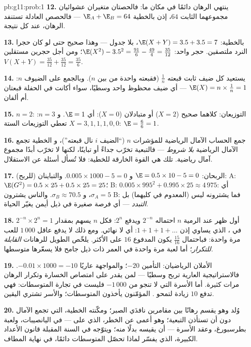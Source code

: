 \begin{solution}{pb:g11:prob:1}
\textbf{12.} ينتهي الرهان دائمًا في مكان ما: فالحصتان
متغيران عشوائيان مجموعهما الثابت $64$، إذن بالخطية
$\E_A + \E_B = 64$ --- فالحصص العادلة تستنفد الرهان،
عند كل نتيجة.

\textbf{13.} بالخطية: $\E(X + Y) = 3.5 + 3.5 = 7$، بلا جدول
--- وهذا صحيح حتى لو كان حجرا النرد ملتصقين.  حجر واحد:
$\E(X^2) - 3.5^2 = \frac{91}{6} - \frac{49}{4} = \frac{35}{12}$؛
ومن أجل حجرين مستقلين
$V(X + Y) = \frac{35}{12} + \frac{35}{12} = \frac{35}{6}$.

\textbf{14.} يستعيد كل ضيف ثابت قبعته 
$\frac1n$ (فقبعته واحدة من بين $n$). وبالجمع
على الضيوف $n$:
$\E(X) = n \times \frac1n = 1$ --- أي ضيف محظوظ واحد وسطيًا،
سواء أكانت في الحفلة قبعتان أم ألفان.

\textbf{15.} $n = 2$: التوزيعان: كلاهما صحيح ($X = 2$) أو
متبادلان ($X = 0$): أي $\E = 1$. و $n = 3$: تعطي التوزيعات الستة
$X = 3, 1, 1, 1, 0, 0$: $\E = \frac{6}{6} = 1$.

\textbf{16.} جمع الحساب الآمال الرياضية للمؤشرات $n$
 (``الضيف $i$ نال قبعته'')، و
الخطية تجمع الآمال الرياضية \emph{بلا شروط} ---
فالتبعية تخرّب جداءً أو تباينًا، لكنها لا تخرّب أبدًا
مجموع آمال رياضية. تلك هي القوة الخارقة للخطية: فلا
تُسأل أسئلة عن الاستقلال.

\textbf{17.} الربحان: $\E = 0.5 \times 10 - 5 = 0$ و
$0.005 \times 1000 - 5 = 0$. والتباينان (للربح):
A: $\E(G^2) = 0.5 \times 25 + 0.5 \times 25 = 25$؛
B: $0.005 \times 995^2 + 0.995 \times 25 \approx 4\,975$:
أي $\sigma_A = 5$، و $\sigma_B \approx 70.5$. والناس يشترون B: فما
يشترونه ليس  (المعدوم في كليهما) بل
\emph{التبدد} --- أي فرصة صغيرة في ذيل أيمن يغيّر الحياة.

\textbf{18.} أول ظهر عند الرمية $n$ احتماله
$2^{-n}$ ويدفع $2^n$: فكل $n$ يسهم بمقدار
$2^{-n} \times 2^n = 1$ في ، الذي يساوي إذن
$1 + 1 + 1 + \dots$: أي لا نهائي. ومع ذلك لا يدفع عاقل
$1\,000$ للعب مرة واحدة: فباحتمال $\frac{15}{16}$ يكون
المدفوع $16$ على الأكثر.  يلخّص  الطويل
للرهانات \emph{القابلة للتكرار}؛ أما لعبة مرة واحدة في العمر ذات
ذيل جامح فلا يسعّرها متوسطها.

\textbf{19.} الأملان الرياضيان: التأمين $-20$؛ والمواجهة عاريًا
$-0.01 \times 1000 = -10$. فالاستراتيجية العارية تربح وسطيًا
--- لمن يقدر على امتصاص الخسارة وتكرار الرهان
مرات كثيرة. أما الأسرة التي لا تنجو من $-1\,000$ فليست
في تجارة المتوسطات: فهي تدفع $10$ زيادة لتمحو
. المؤمّنون يأخذون المتوسطات؛ والأسر تشتري اليقين.

\textbf{20.} وُلد وهو يقسم رهانًا بين مقامرين
نافدَي الصبر؛ ومكّنته الخطية، التي تجمع الآمال دون أن
تستأذن التبعية؛ وهو أعمى عن الخطر، الذي على 
--- في اليانصيبات، ولعبة بطرسبورغ، وعقد الأسرة ---
أن يقيسه بدلًا منه؛ ويتوّجه في السنة المقبلة قانون الأعداد
الكبيرة، الذي يفسّر لماذا تحصّل المتوسطات دائمًا،
في نهاية المطاف.
\end{solution}
